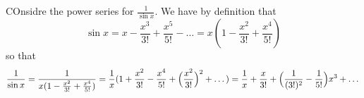 \begin{example}\label{example_2.2}
    COnsidre the power series for $\frac{1}{\sin{x}}$. We have by definition
    that
    \begin{equation*}
        \sin{x}=x-\frac{x^3}{3!}+\frac{x^5}{5!}-\dots
        =x(1-\frac{x^2}{3!}+\frac{x^4}{5!})
    \end{equation*}
    so that
    \begin{equation*}
        \frac{1}{\sin{x}}=\frac{1}{x(1-\frac{x^2}{3!}+\frac{x^4}{5!})}=
        \frac{1}{x}(1+\frac{x^2}{3!}-\frac{x^4}{5!}+
        \Big{(}\frac{x^2}{3!}\Big{)}^2+\dots)=
        \frac{1}{x}+\frac{x}{3!}+\Big{(}\frac{1}{(3!)^2}-\frac{1}{5!}\Big{)}x^3+\dots
    \end{equation*}
\end{example}
